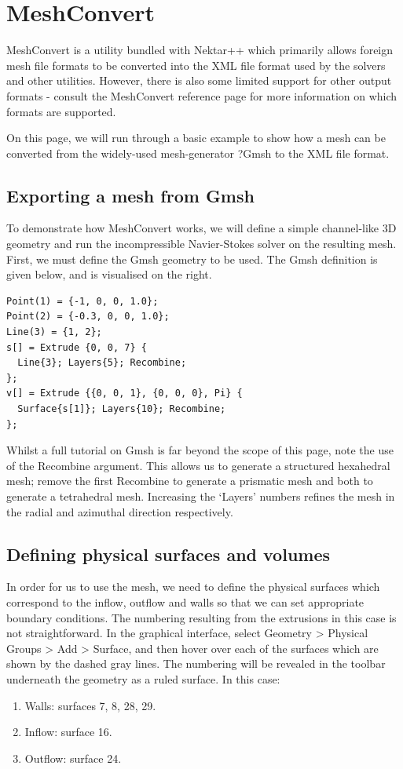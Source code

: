 \section{MeshConvert}
\label{s:utilities:meshconvert}
MeshConvert is a utility bundled with Nektar++ which primarily allows foreign mesh file formats to be converted into the XML file format used by the solvers and other utilities. However, there is also some limited support for other output formats - consult the MeshConvert reference page for more information on which formats are supported.

On this page, we will run through a basic example to show how a mesh can be converted from the widely-used mesh-generator ?Gmsh to the XML file format.


\subsection{Exporting a mesh from Gmsh}

To demonstrate how MeshConvert works, we will define a simple channel-like 3D geometry and run the incompressible Navier-Stokes solver on the resulting mesh. First, we must define the Gmsh geometry to be used. The Gmsh definition is given below, and is visualised on the right.


\begin{lstlisting}[style=XmlStyle]
Point(1) = {-1, 0, 0, 1.0};
Point(2) = {-0.3, 0, 0, 1.0};
Line(3) = {1, 2};
s[] = Extrude {0, 0, 7} {
  Line{3}; Layers{5}; Recombine;
};
v[] = Extrude {{0, 0, 1}, {0, 0, 0}, Pi} {
  Surface{s[1]}; Layers{10}; Recombine;
};
\end{lstlisting}
Whilst a full tutorial on Gmsh is far beyond the scope of this page, note the use of the Recombine argument. This allows us to generate a structured hexahedral mesh; remove the first Recombine to generate a prismatic mesh and both to generate a tetrahedral mesh. Increasing the `Layers' numbers refines the mesh in the radial and azimuthal direction respectively.
\subsection{Defining physical surfaces and volumes}

In order for us to use the mesh, we need to define the physical surfaces which correspond to the inflow, outflow and walls so that we can set appropriate boundary conditions. The numbering resulting from the extrusions in this case is not straightforward. In the graphical interface, select Geometry > Physical Groups > Add > Surface, and then hover over each of the surfaces which are shown by the dashed gray lines. The numbering will be revealed in the toolbar underneath the geometry as a ruled surface. In this case:
\begin{enumerate}
\item Walls: surfaces 7, 8, 28, 29.
\item Inflow: surface 16.
\item Outflow: surface 24.
\end{enumerate}

